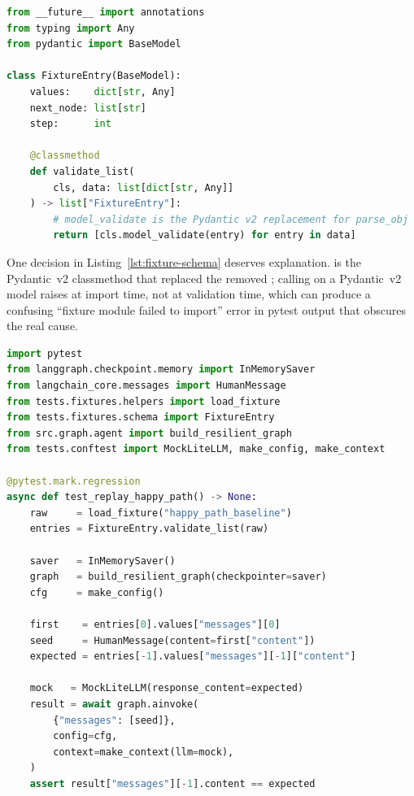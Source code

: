 \begin{lstlisting}[language=Python, caption={Fixture entry schema with
  Pydantic~v2 \texttt{model\_validate}
  (\texttt{tests/fixtures/schema.py}).},
  label={lst:fixture-schema}]
from __future__ import annotations
from typing import Any
from pydantic import BaseModel

class FixtureEntry(BaseModel):
    values:    dict[str, Any]
    next_node: list[str]
    step:      int

    @classmethod
    def validate_list(
        cls, data: list[dict[str, Any]]
    ) -> list["FixtureEntry"]:
        # model_validate is the Pydantic v2 replacement for parse_obj
        return [cls.model_validate(entry) for entry in data]
\end{lstlisting}

One decision in Listing~\ref{lst:fixture-schema} deserves explanation.
 is the Pydantic~v2 classmethod that replaced the
removed ; calling  on a Pydantic~v2
model raises  at import time, not at validation
time, which can produce a confusing ``fixture module failed to import''
error in pytest output that obscures the real cause.

\begin{lstlisting}[language=Python, caption={Replay test that verifies
  a baseline state sequence
  (\texttt{tests/regression/test\_replay.py}).},
  label={lst:replay-test}]
import pytest
from langgraph.checkpoint.memory import InMemorySaver
from langchain_core.messages import HumanMessage
from tests.fixtures.helpers import load_fixture
from tests.fixtures.schema import FixtureEntry
from src.graph.agent import build_resilient_graph
from tests.conftest import MockLiteLLM, make_config, make_context

@pytest.mark.regression
async def test_replay_happy_path() -> None:
    raw     = load_fixture("happy_path_baseline")
    entries = FixtureEntry.validate_list(raw)

    saver   = InMemorySaver()
    graph   = build_resilient_graph(checkpointer=saver)
    cfg     = make_config()

    first    = entries[0].values["messages"][0]
    seed     = HumanMessage(content=first["content"])
    expected = entries[-1].values["messages"][-1]["content"]

    mock   = MockLiteLLM(response_content=expected)
    result = await graph.ainvoke(
        {"messages": [seed]},
        config=cfg,
        context=make_context(llm=mock),
    )
    assert result["messages"][-1].content == expected
\end{lstlisting}

